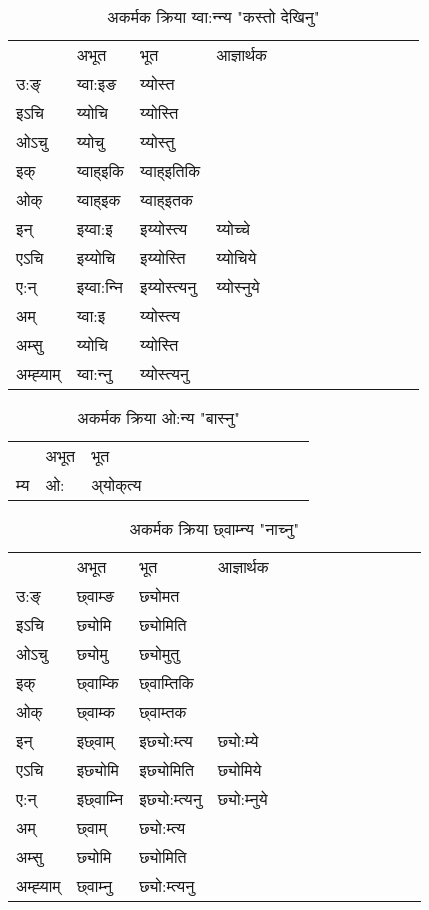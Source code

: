 \begin{table}[H]
\centering
\caption{\label{ot.vi} अकर्मक क्रिया  य्वा:न्‍न्य  "कस्तो देखिनु"  }
\begin{tabular}{l|l|l|l|l|l|l|l|l|l|l|l|l}  \toprule
&अभूत & भूत & आज्ञार्थक \\ 
उ:ङ्‌ &य्वा:इङ &य्योस्त \\ 
इऽचि &य्योचि &य्योस्ति   \\ 
ओऽचु &य्योचु &य्योस्तु   \\ 
इक् &य्वाह्इकि &य्वाह्इतिकि   \\ 
ओक् &य्वाह्इक &य्वाह्इतक   \\ 
इन् & इय्वा:इ & इय्योस्त्य &य्योच्‍चे  \\ 
एऽचि & इय्योचि & इय्योस्ति &य्योचिये    \\ 
ए:न् & इय्वा:न्‍नि  & इय्योस्त्यनु &य्योस्‍नुये  \\ 
अम् & य्वा:इ & य्योस्त्य   \\ 
अम्सु & य्योचि & य्योस्ति   \\ 
अम्ह्‍याम् & य्वा:न्‍नु  & य्योस्त्यनु \\ 
\bottomrule
\end{tabular}
\end{table}


\begin{table}[H]
\centering
\caption{\label{ok.vi} अकर्मक क्रिया  ओ:न्य  "बास्नु"  }
\begin{tabular}{l|l|l|l|l|l|l|l|l|l|l|l|l}  \toprule
&अभूत & भूत   \\ 
म्य & ओ: & अ्योक्‌त्य   \\ 
\bottomrule
\end{tabular}
\end{table}


\begin{table}[H]
\centering
\caption{\label{om.vi} अकर्मक क्रिया  छ्वाम्‍न्य  "नाच्नु"  }
\begin{tabular}{l|l|l|l|l|l|l|l|l|l|l|l|l}  \toprule
&अभूत & भूत & आज्ञार्थक \\ 
उ:ङ्‌ &छ्वाम्ङ &छ्योमत \\ 
इऽचि &छ्योमि &छ्योमिति   \\ 
ओऽचु &छ्योमु &छ्योमुतु   \\ 
इक् &छ्वाम्कि &छ्वाम्तिकि   \\ 
ओक् &छ्वाम्क &छ्वाम्तक   \\ 
इन् & इछ्वाम् & इछ्यो:म्त्य &छ्यो:म्ये  \\ 
एऽचि & इछ्योमि & इछ्योमिति &छ्योमिये    \\ 
ए:न् & इछ्वाम्‍नि  & इछ्यो:म्त्यनु &छ्यो:म्‍नुये  \\ 
अम् & छ्वाम् & छ्यो:म्त्य   \\ 
अम्सु & छ्योमि & छ्योमिति   \\ 
अम्ह्‍याम् & छ्वाम्‍नु  & छ्यो:म्त्यनु \\ 
\bottomrule
\end{tabular}
\end{table}


